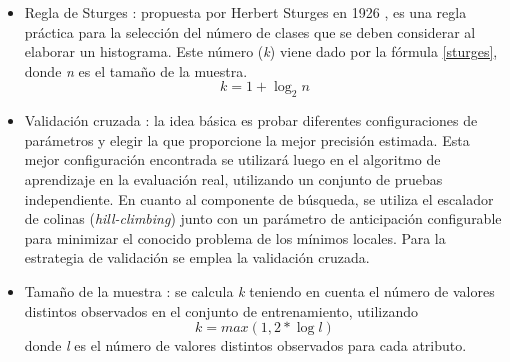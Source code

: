 \begin{itemize}
	
	\item Regla de Sturges \citep{coria2013mineria}: propuesta por Herbert Sturges en 1926 \citep{sturges1926choice}, es una regla práctica para la selección del número de clases que se deben considerar al elaborar un histograma. Este número (\textit{k}) viene dado por la fórmula \ref{sturges}, donde \textit{n} es el tamaño de la muestra.
	\begin{equation} \label{sturges}
		k = 1 + \log_{2} n
	\end{equation}
	
	\item Validación cruzada \citep{torgo1997search}: la idea básica es probar diferentes configuraciones de parámetros y elegir la que proporcione la mejor precisión estimada. Esta mejor configuración encontrada se utilizará luego en el algoritmo de aprendizaje en la evaluación real, utilizando un conjunto de pruebas independiente. En cuanto al componente de búsqueda, se utiliza el escalador de colinas (\textit{hill-climbing}) junto con un parámetro de anticipación configurable para minimizar el conocido problema de los mínimos locales. Para la estrategia de validación se emplea la validación cruzada.
	
	\item Tamaño de la muestra \citep{dougherty1995supervised}: se calcula \textit{k} teniendo en cuenta el número de valores distintos observados en el conjunto de entrenamiento, utilizando
	\begin{equation}
		k = max(1, 2 * \log l )
	\end{equation}
	donde \textit{l} es el número de valores distintos observados para cada atributo.
	
\end{itemize}

